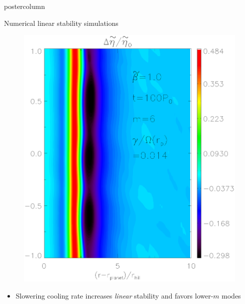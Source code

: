 \documentclass[final,hyperref={pdfpagelabels=false}]{beamer}
\begin{document}
\begin{frame}
\begin{columns}
\begin{column}{.49\textwidth}
\begin{beamercolorbox}[center,wd=\textwidth]{postercolumn}
\begin{minipage}[T]{.95\textwidth}
{\begin{block}{{\Large Numerical linear stability simulations}}
\begin{minipage}[t]{0.49\textwidth}
\begin{figure}
                        \includegraphics[width=.9\textwidth,clip=false,trim=0cm
                        0cm .1cm 0cm]{Posterfig_medb}
                      \end{figure}
                    \end{minipage}    
                    \begin{itemize}
                    \item Slowering cooling rate increases
                      \emph{linear} stability and favors lower-$m$ modes
                    \end{itemize}

\end{block}}
\end{minipage}
\end{beamercolorbox}
\end{column}
\end{columns}
\end{frame}
\end{document}
